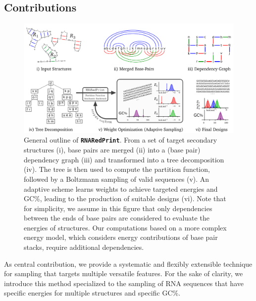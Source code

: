 \documentclass[]{bmcart}
\newcommand{\Nuc}[1]{{\sf #1}}
\newcommand{\Cb}{\Nuc{C}}
\newcommand{\Gb}{\Nuc{G}}
\newcommand{\GCb}{\Gb\Cb}
\newcommand{\ourprog}{{\tt \bfseries{}\color{black!85}RNA\textcolor{red!70!black}{Red}Print}}
\newcommand{\revised}[1]{{\color{red} #1}}
\begin{document}
\subsection*{Contributions}

\begin{figure}[t]
\begin{center}
    \includegraphics[width=.8\textwidth]{Figs/Workflow}
\end{center}
\caption{General outline of \ourprog{}. From a set of target secondary structures (i), base pairs are merged (ii) into a (base pair) dependency graph (iii) and transformed into a tree decomposition (iv). The tree is then used to compute the partition function, followed by a Boltzmann sampling of valid sequences (v). An adaptive scheme learns weights to achieve targeted energies and \GCb\%, leading to the production of suitable designs (vi). \revised{Note that for simplicity, we assume in this figure that only dependencies between the ends of base pairs are considered to evaluate the energies of structures. Our computations based on a more complex energy model, which considers energy contributions of base pair stacks, require additional dependencies.}
  }
\label{fig:workflow}
\end{figure}

\revised{As central contribution, we provide a systematic and flexibly extensible technique for sampling that targets multiple versatile features. For the sake of clarity, we introduce this method specialized to the sampling of RNA sequences that have specific energies for multiple structures and specific \GCb\%.}
\end{document}
